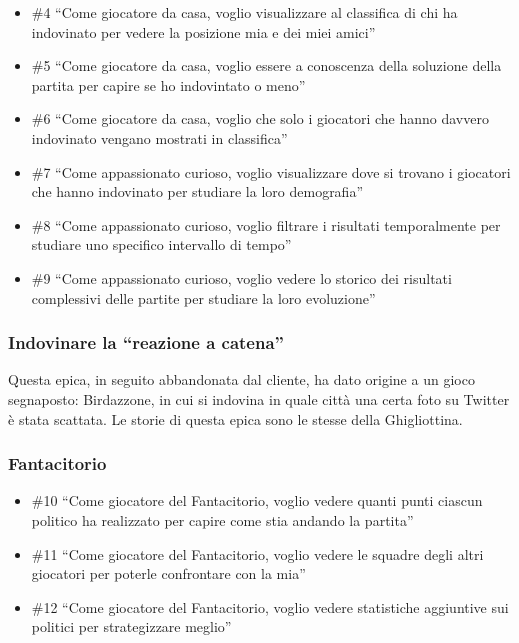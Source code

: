 \documentclass{article}
\begin{document}
\begin{itemize}
	\item \#4 ``Come giocatore da casa, voglio visualizzare al classifica di chi ha
	      indovinato per vedere la posizione mia e dei miei amici''
	\item \#5 ``Come giocatore da casa, voglio essere a conoscenza della soluzione
	      della partita per capire se ho indovintato o meno''
	\item \#6 ``Come giocatore da casa, voglio che solo i giocatori che hanno davvero
	      indovinato vengano mostrati in classifica''
	\item \#7 ``Come appassionato curioso, voglio visualizzare dove si trovano i
	      giocatori che hanno indovinato per studiare la loro demografia''
	\item \#8 ``Come appassionato curioso, voglio filtrare i risultati temporalmente
	      per studiare uno specifico intervallo di tempo''
	\item \#9 ``Come appassionato curioso, voglio vedere lo storico dei risultati
	      complessivi delle partite per studiare la loro evoluzione''
\end{itemize}

\subsubsection{Indovinare la ``reazione a catena''}

Questa epica, in seguito abbandonata dal cliente, ha dato origine a un gioco
segnaposto: Birdazzone, in cui si indovina in quale città una certa foto su
Twitter è stata scattata. Le storie di questa epica sono le stesse della
Ghigliottina.

\subsubsection{Fantacitorio}

\begin{itemize}
	\item \#10 ``Come giocatore del Fantacitorio, voglio vedere quanti punti ciascun
	      politico ha realizzato per capire come stia andando la partita''
	\item \#11 ``Come giocatore del Fantacitorio, voglio vedere le squadre degli altri
	      giocatori per poterle confrontare con la mia''
	\item \#12 ``Come giocatore del Fantacitorio, voglio vedere statistiche aggiuntive
	      sui politici per strategizzare meglio''
\end{itemize}
\end{document}
